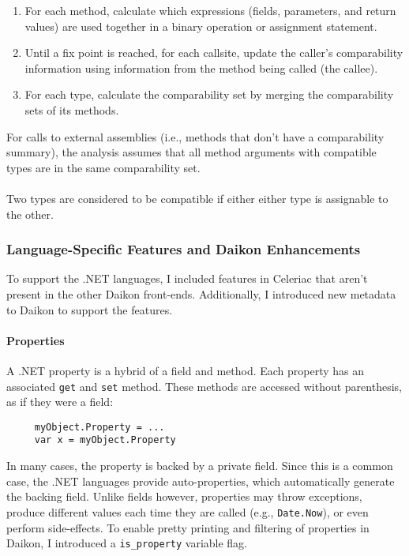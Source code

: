 \begin{enumerate}
\item For each method, calculate which expressions (fields,
  parameters, and return values) are used together in a binary
  operation or assignment statement.
\item Until a fix point is reached, for each callsite, update the
  caller's comparability information using information from the method
  being called (the callee).
\item For each type, calculate the comparability set by merging the
  comparability sets of its methods.
\end{enumerate}

For calls to external assemblies (i.e., methods that don't have a
comparability summary), the analysis assumes that all method arguments
with compatible types are in the same comparability set.
\\ \\
Two types are considered to be compatible if either either type is
assignable to the other.

\subsubsection{Language-Specific Features and Daikon Enhancements}

To support the .NET languages, I included features in Celeriac that
aren't present in the other Daikon front-ends. Additionally, I
introduced new metadata to Daikon to support the features.

 \paragraph{Properties}

 A .NET property is a hybrid of a field and method. Each property has an
 associated \verb|get| and \verb|set| method. These methods are
 accessed without parenthesis, as if they were a field:

 \begin{verbatim}
     myObject.Property = ...
     var x = myObject.Property
 \end{verbatim}

 In many cases, the property is backed by a private field. Since this
 is a common case, the .NET languages provide auto-properties, which
 automatically generate the backing field. Unlike fields however,
 properties may throw exceptions, produce different values each time
 they are called (e.g., \verb|Date.Now|), or even perform
 side-effects.
 To enable pretty printing and filtering of properties in Daikon, I
 introduced a \verb|is_property| variable flag.

